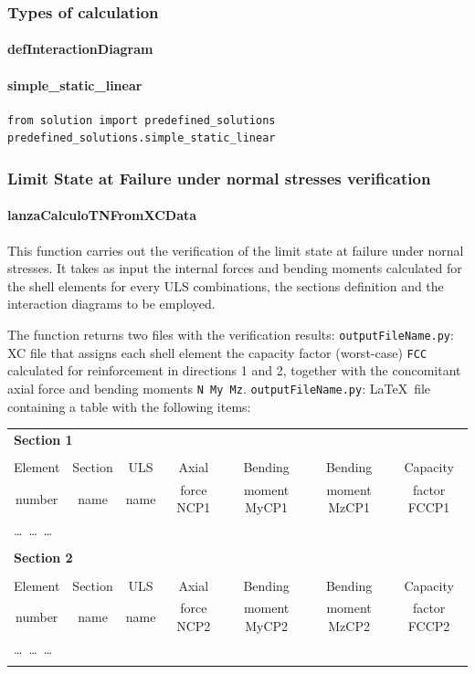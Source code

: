 \subsubsection{Types of calculation}
\paragraph{defInteractionDiagram}

\paragraph{simple\_static\_linear}
\begin{verbatim}
from solution import predefined_solutions
predefined_solutions.simple_static_linear
\end{verbatim}

\subsubsection{Limit State at Failure under normal stresses verification}

\paragraph{lanzaCalculoTNFromXCData}
This function carries out the verification of the limit state at failure under nornal stresses. It takes as input the internal forces and bending moments calculated for the shell elements for every ULS combinations, the sections definition and the interaction diagrams to be employed.

The function returns two files with the verification results:
{\tt outputFileName.py}: XC file that assigns each shell element the capacity factor (worst-case) {\tt FCC} calculated for reinforcement in directions 1 and 2, together with the concomitant axial force and bending moments {\tt N My Mz}.
{\tt outputFileName.py}: \LaTeX\  file containing a table with the following items:

\begin{center}
\begin{tabular}{ccccccc}
\multicolumn{7}{l}{\textbf{Section 1}} \\
\\
Element & Section & ULS & Axial & Bending & Bending & Capacity \\
number  & name & name & force NCP1 & moment MyCP1 & moment MzCP1 & factor FCCP1 \\
\hline
\multicolumn{7}{l}{\ldots\ \ldots\ \ldots} \\
\\
\multicolumn{7}{l}{\textbf{Section 2}} \\
\\
Element & Section & ULS & Axial & Bending & Bending & Capacity \\
number  & name & name & force NCP2 & moment MyCP2 & moment MzCP2 & factor FCCP2 \\
\hline
\multicolumn{7}{l}{\ldots\ \ldots\ \ldots} \\
\\

\end{tabular}
\end{center}

